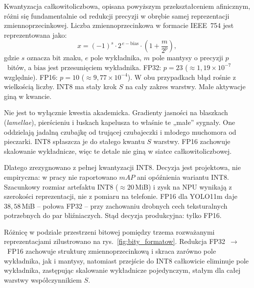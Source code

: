 Kwantyzacja całkowitoliczbowa, opisana powyższym przekształceniem afinicznym, różni się fundamentalnie od redukcji precyzji w obrębie samej reprezentacji zmiennoprzecinkowej. Liczba zmiennoprzecinkowa w formacie IEEE~754 jest reprezentowana jako:
\begin{equation}
x = (-1)^{s} \cdot 2^{\,e-\mathrm{bias}} \cdot \left(1 + \frac{m}{2^{p}}\right),
\end{equation}
gdzie $s$ oznacza bit znaku, $e$ pole wykładnika, $m$ pole mantysy o precyzji $p$~bitów, a $\mathrm{bias}$ jest przesunięciem wykładnika. FP32: $p=23$ ($\approx1{,}19\times10^{-7}$ względnie). FP16: $p=10$ ($\approx9{,}77\times10^{-4}$). W obu przypadkach błąd rośnie z wielkością liczby. INT8 ma stały krok $S$ na cały zakres warstwy. Małe aktywacje giną w kwancie.

Nie jest to wyłącznie kwestia akademicka. Gradienty jasności na blaszkach (\textit{lamellae}), pierścieniu i łuskach kapelusza to właśnie te „małe” sygnały. One oddzielają jadalną czubajkę od trującej czubajeczki i młodego muchomora od pieczarki. INT8 spłaszcza je do stałego kwantu $S$ warstwy. FP16 zachowuje skalowanie wykładnicze, więc te detale nie giną w siatce całkowitoliczbowej.

Dlatego zrezygnowano z pełnej kwantyzacji INT8. Decyzja jest projektowa, nie empiryczna: w pracy nie raportowano $mAP$ ani opóźnienia wariantu INT8. Szacunkowy rozmiar artefaktu INT8 ($\approx20$\,MiB) i zysk na NPU wynikają z szerokości reprezentacji, nie z pomiaru na telefonie. FP16 dla YOLO11m daje $38{,}58$\,MiB – połowa FP32 – przy zachowaniu drobnych cech teksturalnych potrzebnych do par bliźniaczych. Stąd decyzja produkcyjna: tylko FP16.

Różnicę w podziale przestrzeni bitowej pomiędzy trzema rozważanymi reprezentacjami zilustrowano na rys.~\ref{fig:bity_formatow}. Redukcja FP32~$\rightarrow$~FP16 zachowuje strukturę zmiennoprzecinkową i skraca zarówno pole wykładnika, jak i mantysy, natomiast przejście do INT8 całkowicie eliminuje pole wykładnika, zastępując skalowanie wykładnicze pojedynczym, stałym dla całej warstwy współczynnikiem $S$.

